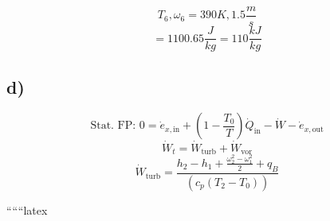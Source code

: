 \[
T_6, \omega_6 = 390K, 1.5 \frac{m}{s}
\]
\[
= 1100.65 \frac{J}{kg} = 110 \frac{kJ}{kg}
\]

\subsection*{d)}
\[
\text{Stat. FP: } 0 = \dot{e}_{x, \text{in}} + \left( 1 - \frac{T_0}{T} \right) \dot{Q}_{\text{in}} - \dot{W} - \dot{e}_{x, \text{out}}
\]
\[
\dot{W}_t = \dot{W}_{\text{turb}} + \dot{W}_{\text{vor}}
\]
\[
\dot{W}_{\text{turb}} = \frac{h_2 - h_1 + \frac{\omega_2^2 - \omega_1^2}{2} + q_B}{(c_p (T_2 - T_0))}
\]

``````latex


